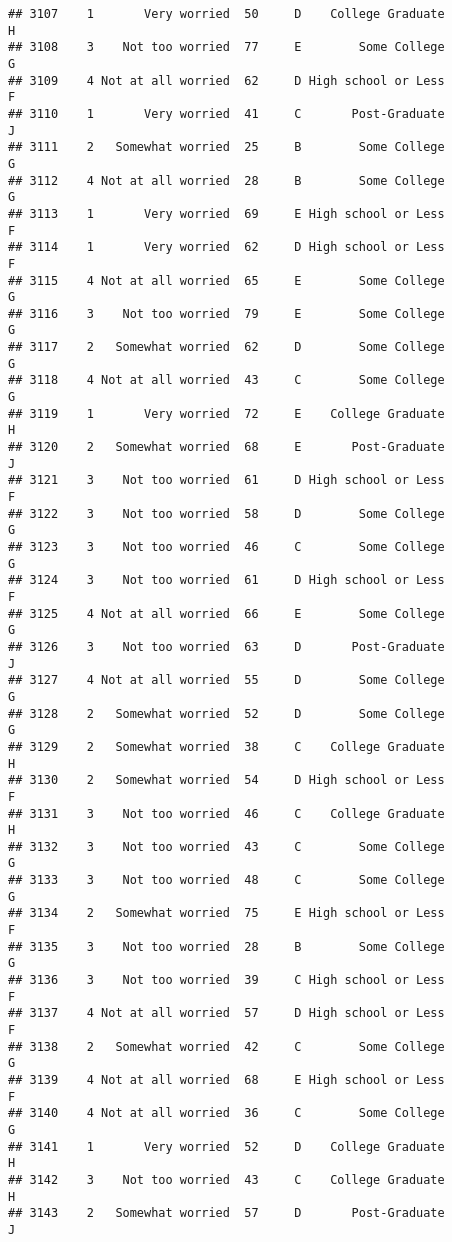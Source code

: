 \documentclass[
]{article}
\begin{document}
\begin{verbatim}
## 3107    1       Very worried  50     D    College Graduate         H
## 3108    3    Not too worried  77     E        Some College         G
## 3109    4 Not at all worried  62     D High school or Less         F
## 3110    1       Very worried  41     C       Post-Graduate         J
## 3111    2   Somewhat worried  25     B        Some College         G
## 3112    4 Not at all worried  28     B        Some College         G
## 3113    1       Very worried  69     E High school or Less         F
## 3114    1       Very worried  62     D High school or Less         F
## 3115    4 Not at all worried  65     E        Some College         G
## 3116    3    Not too worried  79     E        Some College         G
## 3117    2   Somewhat worried  62     D        Some College         G
## 3118    4 Not at all worried  43     C        Some College         G
## 3119    1       Very worried  72     E    College Graduate         H
## 3120    2   Somewhat worried  68     E       Post-Graduate         J
## 3121    3    Not too worried  61     D High school or Less         F
## 3122    3    Not too worried  58     D        Some College         G
## 3123    3    Not too worried  46     C        Some College         G
## 3124    3    Not too worried  61     D High school or Less         F
## 3125    4 Not at all worried  66     E        Some College         G
## 3126    3    Not too worried  63     D       Post-Graduate         J
## 3127    4 Not at all worried  55     D        Some College         G
## 3128    2   Somewhat worried  52     D        Some College         G
## 3129    2   Somewhat worried  38     C    College Graduate         H
## 3130    2   Somewhat worried  54     D High school or Less         F
## 3131    3    Not too worried  46     C    College Graduate         H
## 3132    3    Not too worried  43     C        Some College         G
## 3133    3    Not too worried  48     C        Some College         G
## 3134    2   Somewhat worried  75     E High school or Less         F
## 3135    3    Not too worried  28     B        Some College         G
## 3136    3    Not too worried  39     C High school or Less         F
## 3137    4 Not at all worried  57     D High school or Less         F
## 3138    2   Somewhat worried  42     C        Some College         G
## 3139    4 Not at all worried  68     E High school or Less         F
## 3140    4 Not at all worried  36     C        Some College         G
## 3141    1       Very worried  52     D    College Graduate         H
## 3142    3    Not too worried  43     C    College Graduate         H
## 3143    2   Somewhat worried  57     D       Post-Graduate         J

\end{verbatim}
\end{document}
